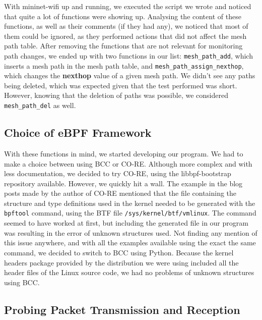 With mininet-wifi up and running, we executed the script we wrote and noticed
that quite a lot of functions were showing up. Analysing the content of these
functions, as well as their comments (if they had any), we noticed that most of
them could be ignored, as they performed actions that did not affect the mesh
path table. After removing the functions that are not relevant for monitoring
path changes, we ended up with two functions in our list:
\texttt{mesh\_path\_add}, which inserts a mesh path in the mesh path table, and
\texttt{mesh\_path\_assign\_nexthop}, which changes the \textbf{nexthop} value
of a given mesh path. We didn't see any paths being deleted, which was expected
given that the test performed was short. However, knowing that the deletion of
paths was possible, we considered \texttt{mesh\_path\_del} as well.


\subsection{Choice of eBPF Framework}

With these functions in mind, we started developing our program. We had to make
a choice between using \ac{BCC} or \ac{CO-RE}. Although more complex and with
less documentation, we decided to try \ac{CO-RE}, using the libbpf-bootstrap
repository available. However, we quickly hit a wall. The example in the blog
posts made by the author of \ac{CO-RE} mentioned that the file containing the
structure and type definitions used in the kernel needed to be generated with
the \texttt{bpftool} command, using the \ac{BTF} file
\texttt{/sys/kernel/btf/vmlinux}. The command seemed to have worked at first,
but including the generated file in our program was resulting in the error of
unknown structures used. Not finding any mention of this issue anywhere, and
with all the examples available using the exact the same command, we decided to
switch to \ac{BCC} using Python. Because the kernel headers package provided by
the distribution we were using included all the header files of the Linux source
code, we had no problems of unknown structures using \ac{BCC}.


\subsection{Probing Packet Transmission and Reception}\label{subs:pkt}

